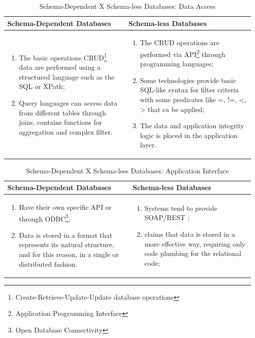 \begin{table}
    \label{tab:schema-vs-schemaless-daccess}
    \caption{Schema-Dependent X Schema-less Databases: Data Access}
    \begin{center}
    \begin{tabular}{|p{210pt}|p{210pt}|}\hline
    Schema-Dependent Databases & Schema-less Databases\\\hline
    \begin{enumerate}
      \item The basic operations CRUD\footnote{Create-Retrieve-Update-Update
      database operations} data are performed using a structured language such
      as the SQL or XPath;
      \item Query languages can access data from different tables through
      joins, contains functions for aggregation and complex filter.
    \end{enumerate} 
    & 
    \begin{enumerate}
      \item The CRUD operations are performed via API\footnote{Application
      Programming Interface} through programming languages;
      \item Some technologies provide basic SQL-like syntax for filter criteria
      with some predicates like =, !=, <, > that ca be applied;
      \item The data and application integrity logic is placed in the
      application layer.
    \end{enumerate}
    \\\hline
    \end{tabular}
    \end{center}
\end{table}

\begin{table}
    \label{tab:tab:schema-vs-schemaless-api-interface}
    \caption{Schema-Dependent X Schema-less Databases: Application Interface}
    \begin{center}
    \begin{tabular}{|p{210pt}|p{210pt}|}\hline
    Schema-Dependent Databases & Schema-less Databases\\\hline
    \begin{enumerate}
      \item Have their own specific API or through ODBC\footnote{Open Database
      Connectivity};
      \item Data is stored in a format that represents its natural structure,
      and for this reason, in a single or distributed fashion.
    \end{enumerate} 
    & 
    \begin{enumerate}
      \item Systems tend to provide SOAP/REST \cite{http-rest};
      \item \cite{db-is-rdbs-dommed} claims that data is stored in a more
      effective way, requiring only code plumbing for the relational code;
    \end{enumerate}
    \\\hline
    \end{tabular}
    \end{center}
\end{table}

